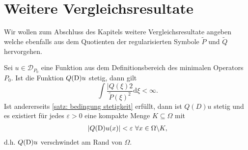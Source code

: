 \section{Weitere Vergleichsresultate}
Wir wollen zum Abschluss des Kapitels weitere Vergleichsresultate angeben welche ebenfalls aus dem Quotienten der regularisierten Symbole $\tilde{P}$ und $ \tilde{Q}$ hervorgehen.
\begin{thm}
\item Sei $u \in \mathcal{D}_{P_0}$ eine Funktion aus dem Definitionsbereich des minimalen Operators $P_0$. Ist die Funktion $Q(\mathrm D)u$ stetig, dann gilt
\begin{equation}\label{satz: bedingung stetigkeit}
\int \frac{|Q(\xi)2}{\tilde{P}(\xi)^2} \mathrm{d}\xi < \infty.
\end{equation}
Ist andererseits \eqref{satz: bedingung stetigkeit} erfüllt, dann ist $Q(D)u$ stetig und es existiert für jedes $\varepsilon >0$ eine kompakte Menge $K \subseteq \Omega$ mit
\begin{align*}
|Q(\mathrm D)u(x)| < \varepsilon \ \forall x \in \Omega \backslash K,
\end{align*}
d.h. $Q(\mathrm D)u$ verschwindet am Rand von $\Omega$.
\end{thm}
